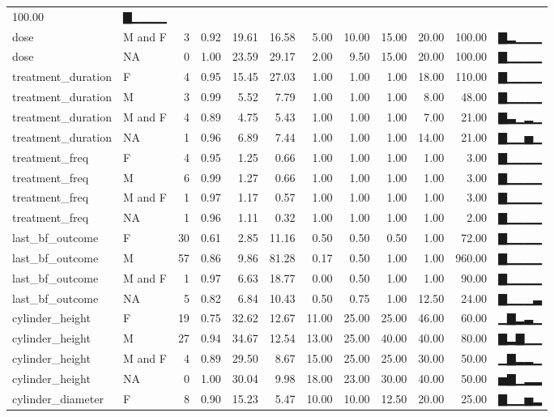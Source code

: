 \documentclass[
]{article}
\begin{document}
\begin{longtable}[]{@{}llrrrrrrrrrl@{}}
100.00 & ▇▁▁▁▁ \\
dose & M and F & 3 & 0.92 & 19.61 & 16.58 & 5.00 & 10.00 & 15.00 & 20.00
& 100.00 & ▇▂▁▁▁ \\
dose & NA & 0 & 1.00 & 23.59 & 29.17 & 2.00 & 9.50 & 15.00 & 20.00 &
100.00 & ▇▁▁▁▁ \\
treatment\_duration & F & 4 & 0.95 & 15.45 & 27.03 & 1.00 & 1.00 & 1.00
& 18.00 & 110.00 & ▇▁▁▁▁ \\
treatment\_duration & M & 3 & 0.99 & 5.52 & 7.79 & 1.00 & 1.00 & 1.00 &
8.00 & 48.00 & ▇▁▁▁▁ \\
treatment\_duration & M and F & 4 & 0.89 & 4.75 & 5.43 & 1.00 & 1.00 &
1.00 & 7.00 & 21.00 & ▇▃▁▂▁ \\
treatment\_duration & NA & 1 & 0.96 & 6.89 & 7.44 & 1.00 & 1.00 & 1.00 &
14.00 & 21.00 & ▇▁▁▅▁ \\
treatment\_freq & F & 4 & 0.95 & 1.25 & 0.66 & 1.00 & 1.00 & 1.00 & 1.00
& 3.00 & ▇▁▁▁▁ \\
treatment\_freq & M & 6 & 0.99 & 1.27 & 0.66 & 1.00 & 1.00 & 1.00 & 1.00
& 3.00 & ▇▁▁▁▁ \\
treatment\_freq & M and F & 1 & 0.97 & 1.17 & 0.57 & 1.00 & 1.00 & 1.00
& 1.00 & 3.00 & ▇▁▁▁▁ \\
treatment\_freq & NA & 1 & 0.96 & 1.11 & 0.32 & 1.00 & 1.00 & 1.00 &
1.00 & 2.00 & ▇▁▁▁▁ \\
last\_bf\_outcome & F & 30 & 0.61 & 2.85 & 11.16 & 0.50 & 0.50 & 0.50 &
1.00 & 72.00 & ▇▁▁▁▁ \\
last\_bf\_outcome & M & 57 & 0.86 & 9.86 & 81.28 & 0.17 & 0.50 & 1.00 &
1.00 & 960.00 & ▇▁▁▁▁ \\
last\_bf\_outcome & M and F & 1 & 0.97 & 6.63 & 18.77 & 0.00 & 0.50 &
1.00 & 1.00 & 90.00 & ▇▁▁▁▁ \\
last\_bf\_outcome & NA & 5 & 0.82 & 6.84 & 10.43 & 0.50 & 0.75 & 1.00 &
12.50 & 24.00 & ▇▁▁▁▃ \\
cylinder\_height & F & 19 & 0.75 & 32.62 & 12.67 & 11.00 & 25.00 & 25.00
& 46.00 & 60.00 & ▁▇▂▃▁ \\
cylinder\_height & M & 27 & 0.94 & 34.67 & 12.54 & 13.00 & 25.00 & 40.00
& 40.00 & 80.00 & ▇▂▇▁▁ \\
cylinder\_height & M and F & 4 & 0.89 & 29.50 & 8.67 & 15.00 & 25.00 &
25.00 & 30.00 & 50.00 & ▁▇▂▂▁ \\
cylinder\_height & NA & 0 & 1.00 & 30.04 & 9.98 & 18.00 & 23.00 & 30.00
& 40.00 & 50.00 & ▅▇▁▂▂ \\
cylinder\_diameter & F & 8 & 0.90 & 15.23 & 5.47 & 10.00 & 10.00 & 12.50
& 20.00 & 25.00 & ▇▁▁▅▂ \\

\end{longtable}
\end{document}
